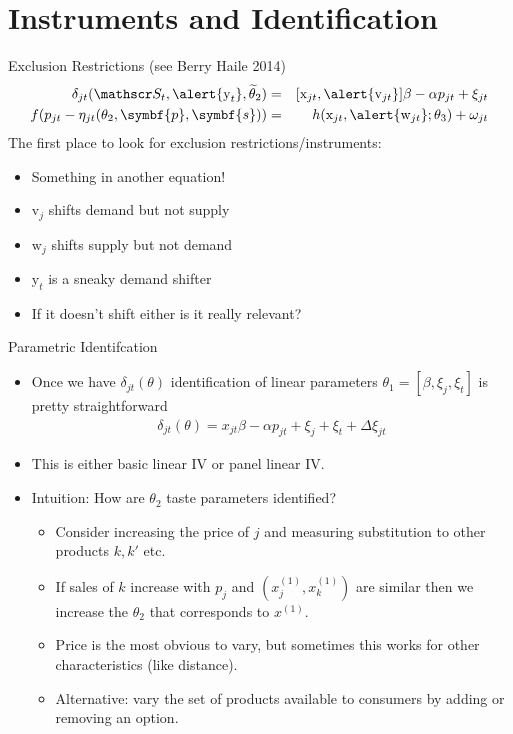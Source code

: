 \documentclass[aspectratio=169,10pt]{beamer}
\begin{document}
\section{Instruments and Identification}
\begin{frame}{Exclusion Restrictions (see Berry Haile 2014)}
\begin{eqnarray*}
    \delta_{jt}(\calS_t,\alert{\textrm{y}_t}, \widetilde{\theta}_2) &=&  [\textrm{x}_{jt}, \alert{\textrm{v}_{jt}}]  \beta  - \alpha p_{jt} + \xi_{jt}\\
    f(p_{jt} - \eta_{jt}(\theta_2,\symbf{p},\symbf{s})) &=&   h(\textrm{x}_{jt},\alert{\textrm{w}_{jt}};\theta_3)+\omega_{jt}
\end{eqnarray*}
The first place to look for exclusion restrictions/instruments:
\begin{itemize}
\item Something in another equation!
\item $\textrm{v}_j$ shifts demand but not supply
\item $\textrm{w}_j$ shifts supply but not demand
\item $\textrm{y}_t$ is a sneaky demand shifter
\item If it doesn't shift either is it really relevant?
\end{itemize}
\end{frame}



\begin{frame}{Parametric Identifcation}
\begin{itemize}
\item Once we have $\delta_{jt}(\theta)$ identification of linear parameters $\theta_1=[\beta,\xi_j, \xi_t]$ is pretty straightforward
\begin{eqnarray*}
\delta_{jt}(\theta) = x_{jt} \beta - \alpha p_{jt} + \xi_j + \xi_t + \Delta \xi_{jt}
\end{eqnarray*}
\item This is either basic linear IV or panel linear IV.
\item Intuition: How are $\theta_2$ taste parameters identified?
\begin{itemize}
\item Consider increasing the price of $j$ and measuring substitution to other products $k,k'$ etc.
\item If sales of $k$ increase with $p_j$ and $(x_j^{(1)},x_k^{(1)})$ are similar then we increase the $\theta_2$ that corresponds to $x^{(1)}$.
\item Price is the most obvious to vary, but sometimes this works for other characteristics (like distance).
\item Alternative: vary the set of products available to consumers by adding or removing an option.
\end{itemize}
\end{itemize}
\end{frame}
\end{document}
